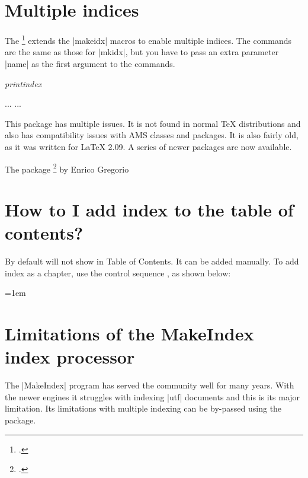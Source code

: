 \section{Multiple indices}

The \footcite{multind} extends the |makeidx| macros to enable multiple indices. The commands are the same as those for |mkidx|, but you have to pass an extra parameter |name| as the first argument to the commands.

\emph{printindex}
\begin{phdverbatim}
\usepackage{multind}
...
...
\end{phdverbatim}

This package has multiple issues. It is not found in normal TeX distributions and also has compatibility issues with AMS classes and packages. It is also fairly old, as it was written for LaTeX 2.09. A series of newer packages are now available.

The package \footcite{imakeidx} by Enrico Gregorio 

\section{How to I add index to the table of contents?}
By default \latexe will not show in Table of Contents. It can be added manually. To add index as a chapter, use the control sequence , as shown below:

\begin{teX}
\clearpage
{}
\printindex
\end{teX}

\begin{teX}
\clearpage
{}
\printindex
\end{teX}

\parindent=1em
\section{Limitations of the MakeIndex index processor}

The |MakeIndex| program has served the \latex community well for many years. With the newer engines it struggles
with indexing |utf| documents and this is its major limitation. Its limitations with multiple indexing can be by-passed
using the  package.

